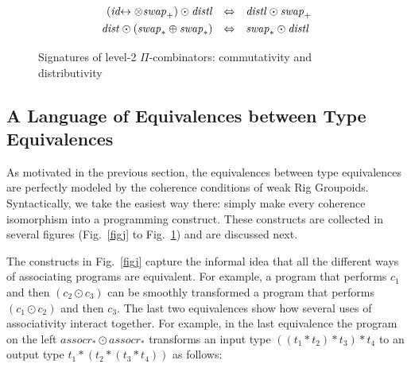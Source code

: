 \documentclass{article}
\newcommand{\swapp}{\mathit{swap}_+}
\newcommand{\swapt}{\mathit{swap}_*}
\newcommand{\assocrt}{\mathit{assocr}_*}
\newcommand{\dist}{\mathit{dist}}
\newcommand{\distl}{\mathit{distl}}
\newcommand{\idc}{\mathit{id}\!\!\leftrightarrow}
\begin{document}
\begin{figure}[t]
\[\def\arraystretch{1.3}
\begin{array}{rcl}
  (\idc \otimes \swapp) \odot \distl &\Leftrightarrow& \distl \odot \swapp
\\
  \dist \odot (\swapt \oplus \swapt) &\Leftrightarrow & \swapt \odot \distl
\end{array}\]
\caption{\label{figa}Signatures of level-2 $\Pi$-combinators: commutativity and distributivity}
\end{figure}

\subsection{A Language of Equivalences between Type Equivalences} 

As motivated in the previous section, the equivalences between type
equivalences are perfectly modeled by the coherence conditions of weak
Rig Groupoids. Syntactically, we take the easiest way there: simply
make every coherence isomorphism into a programming construct. These
constructs are collected in several figures (Fig.~\ref{figj} to
Fig.~\ref{figa}) and are discussed next. 

The constructs in Fig.~\ref{figj} capture the informal idea that all
the different ways of associating programs are equivalent. For
example, a program that performs $c_1$ and then $(c_2 \odot c_3)$ can
be smoothly transformed a program that performs $(c_1 \odot c_2)$ and
then $c_3$. The last two equivalences show how several uses of
associativity interact together. For example, in the last equivalence
the program on the left $\assocrt \odot \assocrt$ transforms an input
type $((t_1 * t_2) * t_3) * t_4$ to an output type
$t_1 * (t_2 * (t_3 * t_4))$ as follows:
\end{document}
